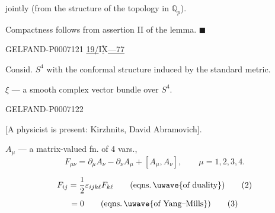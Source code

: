 jointly (from the structure of the topology in \(\mathbb Q_p\)).

Compactness follows from assertion II of the lemma. \(\blacksquare\)


\begin{GelfandAdjacentEvidence}{GELFAND-P000712}{1}
\underline{19/\(\overline{\underline{\mathrm{IX}}}\)---77 }
\quad {}

 Consid. \(S^4\) with the conformal structure induced by the standard metric.

\(\xi\) --- a smooth complex vector bundle over \(S^4\).

\end{GelfandAdjacentEvidence}
\begin{GelfandAdjacentEvidence}{GELFAND-P000712}{2}

[A physicist is present: Kirzhnits, David Abramovich].

 \quad \(A_\mu\) --- a matrix-valued fn. of 4 vars.,
\begin{equation*}
F_{\mu\nu}=\partial_\mu A_\nu-\partial_\nu A_\mu+[A_\mu,A_\nu],
\qquad \mu=1,2,3,4.\tag{1}
\end{equation*}
\end{GelfandAdjacentEvidence}

\begin{equation*}
F_{ij}=\frac{1}{2}\varepsilon_{ijk\ell}F_{k\ell}
\qquad (\text{eqns.}\,\text{\uwave{of duality}})\tag{2}
\end{equation*}
\begin{equation*}
[\partial_\mu+A_\mu,F_{\mu\nu}]=0
\qquad (\text{eqns.}\,\text{\uwave{of Yang–Mills}})\tag{3}
\end{equation*}


